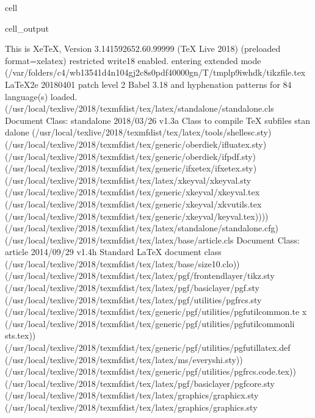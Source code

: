 \documentclass[letterpaper,10pt,english]{jupyterBook}
\begin{document}
\begin{sphinxuseclass}{cell}
\begin{sphinxVerbatimOutput}
\begin{sphinxuseclass}{cell_output}
\begin{sphinxVerbatim}[commandchars=\\\{\}]
This is XeTeX, Version 3.14159265\PYGZhy{}2.6\PYGZhy{}0.99999 (TeX Live 2018) (preloaded format=xelatex)
 restricted \PYGZbs{}write18 enabled.
entering extended mode
(/var/folders/c4/wb13541d4n104gj2c8s0pdf40000gn/T/tmplp9iwhdk/tikzfile.tex
LaTeX2e \PYGZlt{}2018\PYGZhy{}04\PYGZhy{}01\PYGZgt{} patch level 2
Babel \PYGZlt{}3.18\PYGZgt{} and hyphenation patterns for 84 language(s) loaded.
(/usr/local/texlive/2018/texmf\PYGZhy{}dist/tex/latex/standalone/standalone.cls
Document Class: standalone 2018/03/26 v1.3a Class to compile TeX sub\PYGZhy{}files stan
dalone
(/usr/local/texlive/2018/texmf\PYGZhy{}dist/tex/latex/tools/shellesc.sty)
(/usr/local/texlive/2018/texmf\PYGZhy{}dist/tex/generic/oberdiek/ifluatex.sty)
(/usr/local/texlive/2018/texmf\PYGZhy{}dist/tex/generic/oberdiek/ifpdf.sty)
(/usr/local/texlive/2018/texmf\PYGZhy{}dist/tex/generic/ifxetex/ifxetex.sty)
(/usr/local/texlive/2018/texmf\PYGZhy{}dist/tex/latex/xkeyval/xkeyval.sty
(/usr/local/texlive/2018/texmf\PYGZhy{}dist/tex/generic/xkeyval/xkeyval.tex
(/usr/local/texlive/2018/texmf\PYGZhy{}dist/tex/generic/xkeyval/xkvutils.tex
(/usr/local/texlive/2018/texmf\PYGZhy{}dist/tex/generic/xkeyval/keyval.tex))))
(/usr/local/texlive/2018/texmf\PYGZhy{}dist/tex/latex/standalone/standalone.cfg)
(/usr/local/texlive/2018/texmf\PYGZhy{}dist/tex/latex/base/article.cls
Document Class: article 2014/09/29 v1.4h Standard LaTeX document class
(/usr/local/texlive/2018/texmf\PYGZhy{}dist/tex/latex/base/size10.clo))
(/usr/local/texlive/2018/texmf\PYGZhy{}dist/tex/latex/pgf/frontendlayer/tikz.sty
(/usr/local/texlive/2018/texmf\PYGZhy{}dist/tex/latex/pgf/basiclayer/pgf.sty
(/usr/local/texlive/2018/texmf\PYGZhy{}dist/tex/latex/pgf/utilities/pgfrcs.sty
(/usr/local/texlive/2018/texmf\PYGZhy{}dist/tex/generic/pgf/utilities/pgfutil\PYGZhy{}common.te
x
(/usr/local/texlive/2018/texmf\PYGZhy{}dist/tex/generic/pgf/utilities/pgfutil\PYGZhy{}common\PYGZhy{}li
sts.tex))
(/usr/local/texlive/2018/texmf\PYGZhy{}dist/tex/generic/pgf/utilities/pgfutil\PYGZhy{}latex.def
(/usr/local/texlive/2018/texmf\PYGZhy{}dist/tex/latex/ms/everyshi.sty))
(/usr/local/texlive/2018/texmf\PYGZhy{}dist/tex/generic/pgf/utilities/pgfrcs.code.tex))
(/usr/local/texlive/2018/texmf\PYGZhy{}dist/tex/latex/pgf/basiclayer/pgfcore.sty
(/usr/local/texlive/2018/texmf\PYGZhy{}dist/tex/latex/graphics/graphicx.sty
(/usr/local/texlive/2018/texmf\PYGZhy{}dist/tex/latex/graphics/graphics.sty

\end{sphinxVerbatim}
\end{sphinxuseclass}
\end{sphinxVerbatimOutput}
\end{sphinxuseclass}
\end{document}
